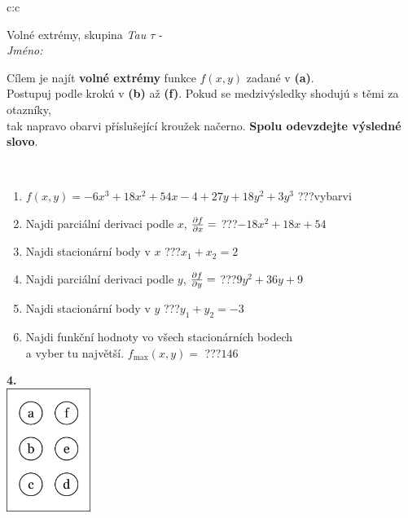 \documentclass[10pt]{report}
\begin{document}
\begin{tabular}{c:c}
\begin{minipage}[c][104.5mm][t]{0.5\linewidth}
\begin{center}
\vspace{7mm}
{\huge Volné extrémy, skupina \textit{Tau $\tau$} -}\\[5mm]
\textit{Jméno:}\phantom{xxxxxxxxxxxxxxxxxxxxxxxxxxxxxxxxxxxxxxxxxxxxxxxxxxxxxxxxxxxxxxxxx}\\[5mm]
\begin{minipage}{0.95\linewidth}
\begin{center}
Cílem je najít \textbf{volné extrémy} funkce $f(x,y)$ zadané v \textbf{(a)}.\\Postupuj podle krokú v \textbf{(b)} až \textbf{(f)}. Pokud se medzivýsledky shodujú s těmi za otazníky,\\tak napravo obarvi příslušející kroužek načerno. \textbf{Spolu odevzdejte výsledné slovo}.
\end{center}
\end{minipage}
\\[1mm]
\begin{minipage}{0.79\linewidth}
\begin{center}
\begin{varwidth}{\linewidth}
\begin{enumerate}
\normalsize
\item $f(x,y)=-6x^3+18x^2+54x-4+27y+18y^2+3y^3$\quad \dotfill\; ???\;\dotfill \quad vybarvi
\item Najdi parciální derivaci podle $x$, $\pdv{f}{x}=$\quad \dotfill\; ???\;\dotfill \quad $-18x^2+18x+54$
\item Najdi stacionární body v $x$\quad \dotfill\; ???\;\dotfill \quad $x_1+x_2=2$
\item Najdi parciální derivaci podle $y$, $\pdv{f}{y}=$\quad \dotfill\; ???\;\dotfill \quad $9y^2+36y+9$
\item Najdi stacionární body v $y$\quad \dotfill\; ???\;\dotfill \quad $y_1+y_2=-3$
\item Najdi funkční hodnoty vo všech stacionárních bodech \\ \phantom{xxxxxx} a vyber tu najvětší. $f_{\text{max}}(x,y)=$\quad \dotfill\; ???\;\dotfill \quad $146$
\end{enumerate}
\end{varwidth}
\end{center}
\end{minipage}
\begin{minipage}{0.20\linewidth}
\begin{center}
{\Huge\bfseries 4.} \\[2mm]
\includegraphics[height=40mm]{../images/braille.png}

\end{center}
\end{minipage}
\end{center}
\end{minipage}
\end{tabular}
\end{document}
